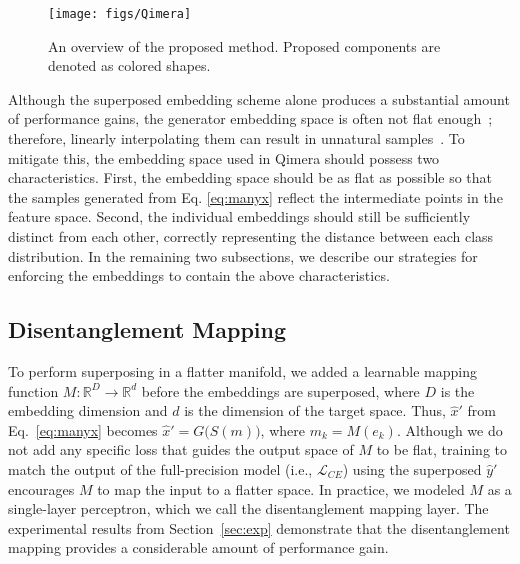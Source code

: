 \documentclass{article}
\newcommand{\aname}{Qimera\xspace}
\newcommand{\loss}{\mathcal{L}}
\begin{document}
\begin{figure}
\centering
	\texttt{[image: figs/Qimera]}
\caption{An overview of the proposed method.
	Proposed components are denoted as colored shapes.} 
	\label{fig:qimera}
\end{figure}


Although the superposed embedding scheme alone produces a substantial amount of performance gains, the generator embedding space is often not flat enough~\cite{oddity}; therefore, linearly interpolating them can result in unnatural samples~\cite{laine}.
To mitigate this, the embedding space used in \aname should possess two characteristics. 
First, the embedding space should be as flat as possible so that the samples generated from Eq. \ref{eq:manyx} reflect the intermediate points in the feature space.
Second, the individual embeddings should still be sufficiently distinct from each other, correctly representing the distance between each class distribution.
In the remaining two subsections, we describe our strategies for enforcing the embeddings to contain the above characteristics.


\subsection{Disentanglement Mapping}
To perform superposing in a flatter manifold, we added a learnable mapping function $M: \mathbb{R}^D \rightarrow \mathbb{R}^d$ before the embeddings are superposed, where $D$ is the embedding dimension and $d$ is the dimension of the target space.
Thus, $\hat{x}'$ from Eq.~\ref{eq:manyx} becomes $\hat x' = G\big(S(m)\big)$, where $m_k = M(e_k)$.
Although we do not add any specific loss that guides the output space of $M$ to be flat, training to match the output of the full-precision model (i.e., $\loss_{CE}$) using the superposed $\hat y'$ encourages $M$ to map the input to a flatter space.
In practice, we modeled $M$ as a single-layer perceptron, which we call the disentanglement mapping layer.
The experimental results from Section~\ref{sec:exp} demonstrate that the disentanglement mapping provides a considerable amount of performance gain. 
\end{document}
